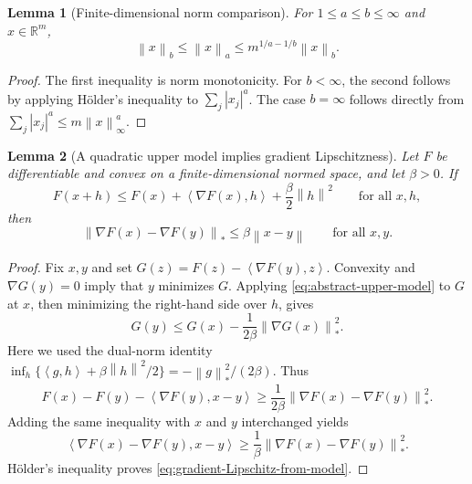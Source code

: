\documentclass[11pt]{article}
\newcommand{\R}{\mathbb{R}}
\newcommand{\ip}[2]{\left\langle #1,#2\right\rangle}
\newcommand{\norm}[2]{\left\lVert #1\right\rVert_{#2}}
\newtheorem{lemma}[lemma]{Lemma}
\theoremstyle{definition}
\theoremstyle{remark}
\begin{document}
\begin{lemma}[Finite-dimensional norm comparison]
\label{lem:norm-comparison}
For $1\le a\le b\le\infty$ and $x\in\R^m$,
\begin{equation}
\label{eq:norm-comparison}
 \norm{x}{b}\le\norm{x}{a}
 \le m^{1/a-1/b}\norm{x}{b}.
\end{equation}
\end{lemma}

\begin{proof}
The first inequality is norm monotonicity.  For $b<\infty$, the second
follows by applying H\"older's inequality to $\sum_j|x_j|^a$.
The case $b=\infty$ follows directly from
$\sum_j|x_j|^a\le m\norm{x}{\infty}^a$.
\end{proof}

\begin{lemma}[A quadratic upper model implies gradient Lipschitzness]
\label{lem:upper-model-implies-smooth}
Let $F$ be differentiable and convex on a finite-dimensional normed space,
and let $\beta>0$.  If
\begin{equation}
\label{eq:abstract-upper-model}
 F(x+h)\le F(x)+\ip{\nabla F(x)}{h}
             +\frac\beta2\norm{h}{}^2
 \qquad\text{for all }x,h,
\end{equation}
then
\begin{equation}
\label{eq:gradient-Lipschitz-from-model}
 \norm{\nabla F(x)-\nabla F(y)}{*}
 \le\beta\norm{x-y}{}
 \qquad\text{for all }x,y.
\end{equation}
\end{lemma}

\begin{proof}
Fix $x,y$ and set $G(z)=F(z)-\ip{\nabla F(y)}{z}$.
Convexity and $\nabla G(y)=0$ imply that $y$ minimizes $G$.
Applying \cref{eq:abstract-upper-model} to $G$ at $x$, then minimizing the
right-hand side over $h$, gives
\[
 G(y)\le G(x)-\frac{1}{2\beta}\norm{\nabla G(x)}{*}^2.
\]
Here we used the dual-norm identity
$\inf_h\{\ip{g}{h}+\beta\norm{h}{}^2/2\}
=-\norm{g}{*}^2/(2\beta)$.
Thus
\begin{equation}
\label{eq:coercive-bregman}
 F(x)-F(y)-\ip{\nabla F(y)}{x-y}
 \ge\frac{1}{2\beta}
       \norm{\nabla F(x)-\nabla F(y)}{*}^2.
\end{equation}
Adding the same inequality with $x$ and $y$ interchanged yields
\[
 \ip{\nabla F(x)-\nabla F(y)}{x-y}
 \ge\frac1\beta\norm{\nabla F(x)-\nabla F(y)}{*}^2.
\]
H\"older's inequality proves \cref{eq:gradient-Lipschitz-from-model}.
\end{proof}
\end{document}
